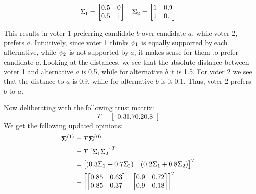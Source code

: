 	\[
		\Sigma_1 =\begin{bmatrix}
			0.5 & 0 \\
			0.5 & 1 \\
		\end{bmatrix}\quad
		\Sigma_2 =\begin{bmatrix}
			1 & 0.9 \\
			1 & 0.1 \\
		\end{bmatrix}
	\]

	This results in voter 1 preferring candidate $b$ over candidate $a$, while voter 2, prefers $a$. Intuitively, since voter 1 thinks $\psi_{1}$ is equally supported by each alternative, while $\psi_{2}$ is not supported by $a$, it makes sense for them to prefer candidate $a$. Looking at the distances, we see that the absolute distance between voter 1 and alternative $a$ is 0.5, while for alternative $b$ it is 1.5. For voter 2 we see that the distance to $a$ is 0.9, while for alternative $b$ is it 0.1. Thus, voter 2 prefers $b$ to $a$.


	Now deliberating with the following trust matrix:
	\[
		T=\begin{bmatrix}
			0.3	0.7
			0.2	0.8
		\end{bmatrix}
	\]
	We get the following updated opinions:
	\begin{align*}
		\boldsymbol{\boldsymbol{\Sigma}}^{(1)} & = T\boldsymbol{\boldsymbol{\Sigma}}^{(0)}                                                                     \\
		                                            & =T\begin{bmatrix}\Sigma_1 \Sigma_2\end{bmatrix}^{T}                                                      \\
		                                            & =\begin{bmatrix}(0.3\Sigma_1 + 0.7\Sigma_{2}) & (0.2\Sigma_1 + 0.8\Sigma_{2})\end{bmatrix}^{T} \\
		                                            & = \begin{bmatrix}
			                                                \begin{bmatrix}
				0.85 & 0.63 \\
				0.85 & 0.37 \\
			\end{bmatrix} &
			                                                \begin{bmatrix}
				0.9 & 0.72 \\
				0.9 & 0.18 \\
			\end{bmatrix}
		                                                \end{bmatrix}^{T}
	\end{align*}

